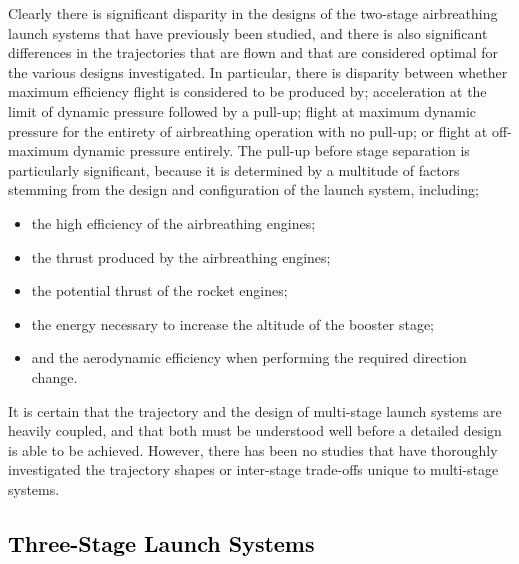 Clearly there is significant disparity in the designs of the two-stage airbreathing launch systems that have previously been studied, and there is also significant differences in the trajectories that are flown and that are considered optimal for the various designs investigated.
In particular, there is disparity between whether maximum efficiency flight is considered to be produced by; acceleration at the limit of dynamic pressure followed by a pull-up; flight at maximum dynamic pressure for the entirety of airbreathing operation with no pull-up; or flight at off-maximum dynamic pressure entirely. The pull-up before stage separation is particularly significant, because it is determined by a multitude of factors stemming from the design and configuration of the launch system, including;
\begin{itemize}
	\item the high efficiency of the airbreathing engines;
	\item the thrust produced by the airbreathing engines;
	\item the potential thrust of the rocket engines;
	\item the energy necessary to increase the altitude of the booster stage;
	\item and the aerodynamic efficiency when performing the required direction change.
\end{itemize}
It is certain that the trajectory and the design of multi-stage launch systems are heavily coupled, and that both must be understood well before a detailed design is able to be achieved. However, there has been no studies that have thoroughly investigated the trajectory shapes or inter-stage trade-offs unique to multi-stage systems. 



  \textcolor{black}{
  \subsection{Three-Stage Launch Systems}\label{sec:threestage}
}
	
